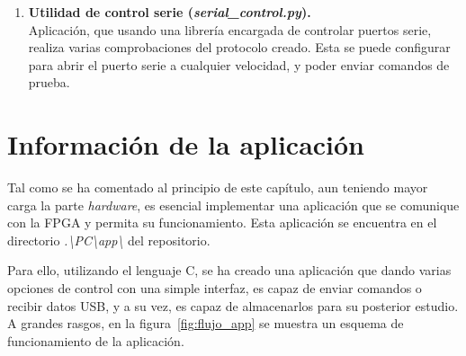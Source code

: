 \begin{enumerate}
    \item \textbf{Utilidad de control serie (\emph{serial\_control.py}).} \\
    Aplicación, que usando una librería encargada de controlar puertos serie, realiza varias comprobaciones del protocolo creado. Esta se puede configurar para abrir el puerto serie a cualquier velocidad, y poder enviar comandos de prueba.
\end{enumerate}

\section{Información de la aplicación}
Tal como se ha comentado al principio de este capítulo, aun teniendo mayor carga la parte \emph{hardware}, es esencial implementar una aplicación que se comunique con la FPGA y permita su funcionamiento. Esta aplicación se encuentra en el directorio \emph{.\textbackslash PC\textbackslash app\textbackslash} del repositorio.

Para ello, utilizando el lenguaje C, se ha creado una aplicación que dando varias opciones de control con una simple interfaz, es capaz de enviar comandos o recibir datos USB, y a su vez, es capaz de almacenarlos para su posterior estudio. A grandes rasgos, en la figura~\ref{fig:flujo_app} se muestra un esquema de funcionamiento de la aplicación.

